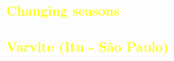 \documentclass[aspectratio=10]{beamer} %
\begin{document}
{%
	
	\begin{frame}
	\frametitle{\textcolor{yellow}{Changing seasons}}
	
\end{frame}
}

{%

\begin{frame}
\frametitle{\textcolor{yellow}{Varvite (Itu - São Paulo)}}

\end{frame}
}
\end{document}
